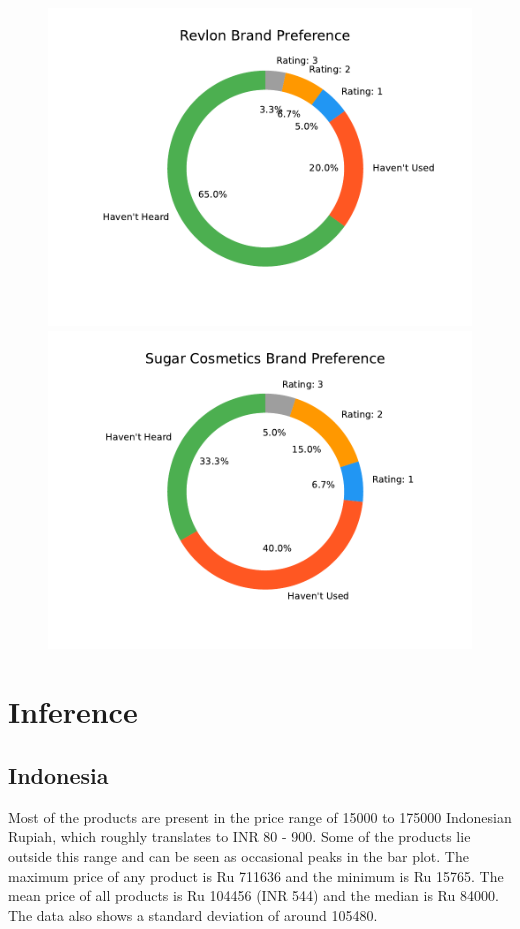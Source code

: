 \documentclass{article}
\begin{document}
\begin{figure}[htbp]
    \centering
    \includegraphics[scale=0.6]{../images/survey-graphs/Revlon-brand-preference.pdf}
    \includegraphics[scale=0.6]{../images/survey-graphs/Sugar Cosmetics-brand-preference.pdf}
\end{figure}


\restoregeometry


\section{Inference}

\subsection{Indonesia}
Most of the products are present in the price range of 15000 to 175000 Indonesian Rupiah, which roughly translates to INR 80 - 900. Some of the products lie outside this range and can be seen as occasional peaks in the bar plot. The maximum price of any product is Ru 711636 and the minimum is Ru 15765. The mean price of all products is Ru 104456 (INR 544) and the median is Ru 84000. The data also shows a standard deviation of around 105480. \\
\end{document}
